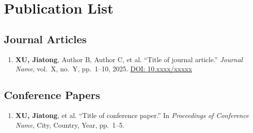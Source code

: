 \chapter{Publication List}


\section*{Journal Articles}

\begin{enumerate}
  \item \textbf{XU, Jiatong}, Author B, Author C, et al.
    ``Title of journal article.''
    \textit{Journal Name}, vol.~X, no.~Y, pp.~1--10, 2025.
    \href{https://doi.org/10.xxxx/xxxxx}{DOI: 10.xxxx/xxxxx}

\end{enumerate}

\section*{Conference Papers}

\begin{enumerate}
  \item \textbf{XU, Jiatong}, et al.
    ``Title of conference paper.''
    In \textit{Proceedings of Conference Name}, City, Country, Year, pp.~1--5.

\end{enumerate}
